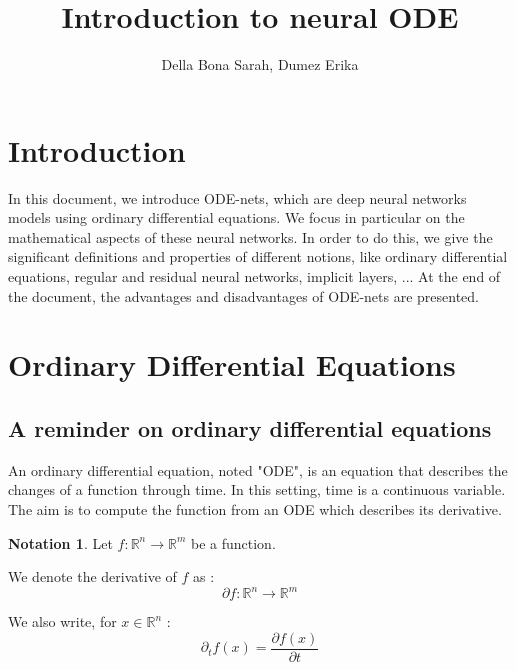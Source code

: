 \documentclass[10pt,a4paper]{article}
\author{Della Bona Sarah, Dumez Erika}
\title{Introduction to neural ODE}
\theoremstyle{definition}
\theoremstyle{definition}
\theoremstyle{definition}
\newtheorem{notation}{Notation}
\begin{document}
\maketitle

\section{Introduction}

In this document, we introduce ODE-nets, which are deep neural networks models using ordinary differential equations. We focus in particular on the mathematical aspects of these neural networks. In order to do this, we give the significant definitions and properties of different notions, like ordinary differential equations, regular and residual neural networks, implicit layers, ... At the end of the document, the advantages and disadvantages of ODE-nets are presented.


\section{Ordinary Differential Equations}

\subsection{A reminder on ordinary differential equations}

An ordinary differential equation, noted "ODE", is an equation that describes the changes of a function through time. In this setting, time is a continuous variable. The aim is to compute the function from an ODE which describes its derivative.


\begin{notation}
Let $f: \mathbb{R}^n \rightarrow \mathbb{R}^m$ be a function.

We denote the derivative of $f$ as :
$$
\partial f : \mathbb{R}^n \rightarrow \mathbb{R}^m
$$

We also write, for $x \in \mathbb{R}^n$ :
$$
\partial_t f(x) = \frac{\partial f(x)}{\partial t} 
$$
\end{notation}
\end{document}

